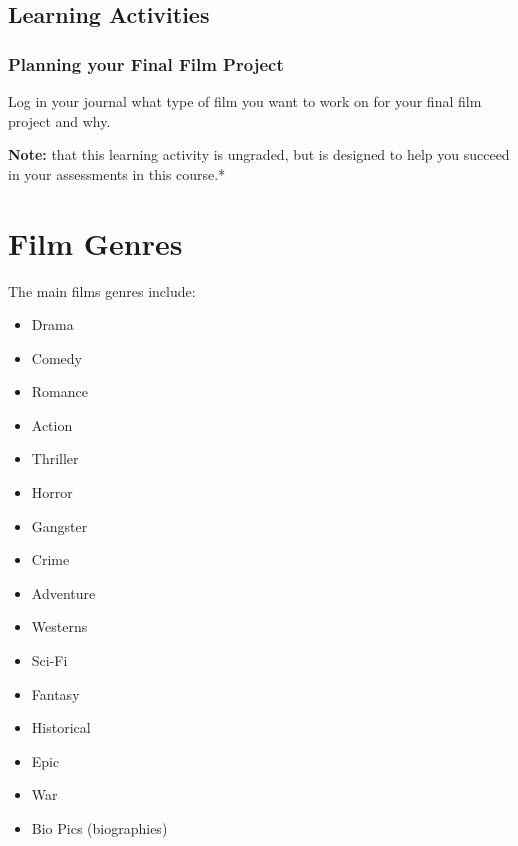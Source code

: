 \documentclass[
]{book}
\providecommand{\tightlist}{%
  \setlength{\itemsep}{0pt}\setlength{\parskip}{0pt}}
\begin{document}
\hypertarget{learning-activities-5}{%
\subsection*{Learning Activities}\label{learning-activities-5}}

\begin{reflect}
\hypertarget{planning-your-final-film-project}{%
\subsubsection*{Planning your Final Film Project}\label{planning-your-final-film-project}}

Log in your journal what type of film you want to work on for your final film project and why.
\end{reflect}

\begin{caution}
\textbf{Note:} that this learning activity is ungraded, but is designed to help you succeed in your assessments in this course.*
\end{caution}

\hypertarget{film-genres}{%
\section{Film Genres}\label{film-genres}}

The main films genres include:

\begin{itemize}
\tightlist
\item
  Drama\\
\item
  Comedy\\
\item
  Romance\\
\item
  Action\\
\item
  Thriller\\
\item
  Horror\\
\item
  Gangster\\
\item
  Crime\\
\item
  Adventure\\
\item
  Westerns\\
\item
  Sci-Fi\\
\item
  Fantasy\\
\item
  Historical\\
\item
  Epic\\
\item
  War\\
\item
  Bio Pics (biographies)
\end{itemize}
\end{document}
